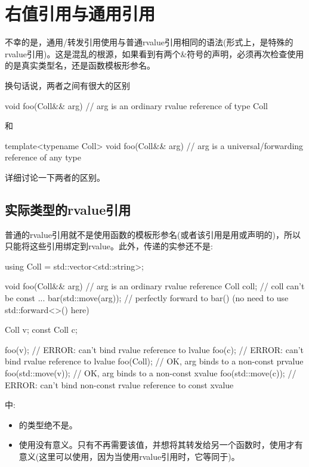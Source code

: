 \section{右值引用与通用引用}
不幸的是，通用/转发引用使用与普通rvalue引用相同的语法(形式上，是特殊的rvalue引用)。这是混乱的根源，如果看到有两个\&符号的声明，必须再次检查使用的是真实类型名，还是函数模板形参名。

换句话说，两者之间有很大的区别

\begin{cppcode}
void foo(Coll&& arg) // arg is an ordinary rvalue reference of type Coll
\end{cppcode}

和

\begin{cppcode}
template<typename Coll>
void foo(Coll&& arg) // arg is a universal/forwarding reference of any type
\end{cppcode}

详细讨论一下两者的区别。

\subsection{实际类型的rvalue引用}

普通的rvalue引用就不是使用函数的模板形参名(或者该引用是用或声明的)，所以只能将这些引用绑定到rvalue。此外，传递的实参还不是:

\begin{cppcode}
using Coll = std::vector<std::string>;

void foo(Coll&& arg) // arg is an ordinary rvalue reference
{
	Coll coll; // coll can’t be const
	...
	bar(std::move(arg)); // perfectly forward to bar() (no need to use std::forward<>() here)
}

Coll v;
const Coll c;

foo(v); // ERROR: can’t bind rvalue reference to lvalue
foo(c); // ERROR: can’t bind rvalue reference to lvalue
foo(Coll{}); // OK, arg binds to a non-const prvalue
foo(std::move(v)); // OK, arg binds to a non-const xvalue
foo(std::move(c)); // ERROR: can’t bind non-const rvalue reference to const xvalue
\end{cppcode}

中:

\begin{itemize}
	\item {}的类型绝不是。
	\item 使用没有意义。只有不再需要该值，并想将其转发给另一个函数时，使用才有意义(这里可以使用，因为当使用rvalue引用时，它等同于)。
\end{itemize}

